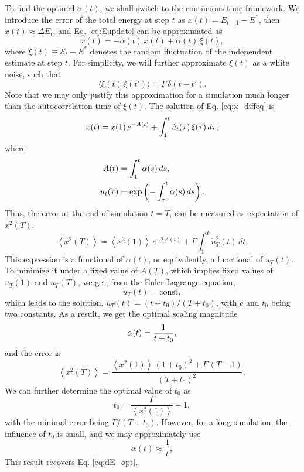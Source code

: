\documentclass[reprint]{revtex4-1}
\begin{document}
To find the optimal $\alpha(t)$,
we shall switch to the continuous-time framework.
%
We introduce the error of the total energy at step $t$ as
$x(t) = E_{t-1} - E^*$,
then $\dot x(t) \approx \Delta E_t$,
and Eq. \eqref{eq:Eupdate} can be approximated as
%
\begin{equation}
  \dot x(t)
  =
  -\alpha(t) \, x(t) + \alpha(t) \, \xi(t)
  ,
  \label{eq:x_diffeq}
\end{equation}
%
where $\xi(t) \equiv \mathcal E_t - E^*$
denotes the random fluctuation of the independent estimate at step $t$.
%
For simplicity, we will further approximate $\xi(t)$ as a white noise,
such that
\begin{equation}
  \langle \xi(t) \, \xi(t') \rangle = \Gamma \, \delta(t - t').
  \label{eq:noise_corr}
\end{equation}
%
Note that we may only justify this approximation
for a simulation much longer than the autocorrelation time of $\xi(t)$.
%
The solution of Eq. \eqref{eq:x_diffeq} is
%
\begin{equation}
  x(t)
  =
  x(1) \, e^{ -A(t) }
  +
  \int_1^t \dot u_t(\tau) \, \xi(\tau) \, d\tau
  ,
  \notag
\end{equation}
%
where
\begin{align*}
  A(t)
  &=
  \int_1^t \alpha(s) \, ds
  ,
\\
  u_t(\tau)
  &= \exp\left(
    -\int_\tau^t \alpha(s) \, ds
  \right)
  .
  \notag
\end{align*}
%
Thus, the error at the end of simulation $t = T$,
can be measured as expectation of $x^2(T)$,
%
\begin{equation}
  \left\langle
    x^2(T)
  \right\rangle
  =
  \left\langle
    x^2(1)
  \right\rangle
  \, e^{ -2 \, A(t) }
  +
  \Gamma
  \int_1^T
    \dot u_T^2(t) \, dt
  .
  \label{eq:err_functional}
\end{equation}
%
%
This expression is a functional of $\alpha(t)$,
or equivalently, a functional of $u_T(t)$.
%
To minimize it under a fixed value of $A(T)$,
which implies fixed values of $u_T(1)$ and $u_T(T)$,
we get, from the Euler-Lagrange equation,
$$
\dot u_T(t) = \mathrm{const},
$$
which leads to the solution,
$u_T(t) = (t + t_0) / (T + t_0)$,
with $c$ and $t_0$ being two constants.
%
As a result, we get the optimal scaling magnitude
%
\begin{equation}
  \alpha(t) = \frac{ 1 } { t + t_0 }
  ,
  \notag
\end{equation}
%
and the error is
%
$$%
  \left\langle
    x^2(T)
  \right\rangle
  =
  \frac{
    \left\langle x^2(1) \right\rangle
    \, (1 + t_0)^2
    + \Gamma \, (T - 1)
  }
  {
    (T + t_0)^2
  }
  ,
$$%
%
We can further determine the optimal value of $t_0$ as
$$
t_0 = \frac{ \Gamma } { \left\langle x^2(1) \right\rangle } - 1,
$$
%
with the minimal error being $\Gamma / (T + t_0)$.
%
However, for a long simulation, the influence of $t_0$
is small, and we may approximately use
$$
\alpha(t) \approx \frac 1 t,
$$
This result recovers Eq. \eqref{eq:dE_opt}.
\end{document}
